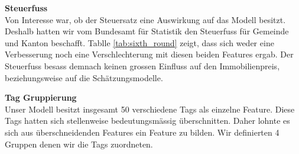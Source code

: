 \begin{table}[ht]
\centering
{}
\caption{Statistische Werte des Kaufpreises nach der Outlier Detection}
\label{tab:price_outlier}
\end{table}

\begin{table}[ht]
\centering
{}
\caption{Ergebnisse mit Einbezug des Steuerfuss}
\label{tab:sixth_round}
\end{table}

\newpage
\clearpage
\textbf{Steuerfuss}\\
Von Interesse war, ob der Steuersatz eine Auswirkung auf das Modell besitzt. Deshalb hatten wir vom Bundesamt für Statistik den Steuerfuss für Gemeinde und Kanton beschafft. Tablle \ref{tab:sixth_round} zeigt, dass sich weder eine Verbesserung noch eine Verschlechterung mit diesen beiden Features ergab. Der Steuerfuss besass demnach keinen grossen Einfluss auf den Immobilienpreis, beziehungsweise auf die Schätzungsmodelle.

\textbf{Tag Gruppierung}\\
Unser Modell besitzt insgesamt 50 verschiedene Tags als einzelne Feature. Diese Tags hatten sich stellenweise bedeutungsmässig überschnitten. Daher lohnte es sich aus überschneidenden Features ein Feature zu bilden. Wir definierten 4 Gruppen denen wir die Tags zuordneten. 

